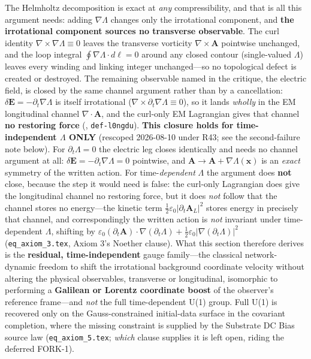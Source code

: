 The Helmholtz decomposition is exact at \emph{any} compressibility, and that is all this argument needs: adding $\nabla\Lambda$ changes only the irrotational component, and \textbf{the irrotational component sources no transverse observable}. The curl identity $\nabla \times \nabla\Lambda \equiv 0$ leaves the transverse vorticity $\nabla \times \mathbf{A}$ pointwise unchanged, and the loop integral $\oint \nabla\Lambda \cdot d\boldsymbol{\ell} = 0$ around any closed contour (single-valued $\Lambda$) leaves every winding and linking integer unchanged---so no topological defect is created or destroyed. The remaining observable named in the critique, the electric field, is closed by the same channel argument rather than by a cancellation: $\delta\mathbf{E} = -\partial_t \nabla\Lambda$ is itself irrotational ($\nabla \times \partial_t\nabla\Lambda \equiv 0$), so it lands \emph{wholly} in the EM longitudinal channel $\nabla\cdot\mathbf{A}$, and the curl-only EM Lagrangian gives that channel \textbf{no restoring force} (, \texttt{def-l0ngdu}). \textbf{This closure holds for time-independent $\Lambda$ ONLY} (rescoped 2026-08-10 under R43; see the second-failure note below). For $\partial_t\Lambda = 0$ the electric leg closes identically and needs no channel argument at all: $\delta\mathbf{E} = -\partial_t\nabla\Lambda = 0$ pointwise, and $\mathbf{A} \to \mathbf{A} + \nabla\Lambda(\mathbf{x})$ is an \emph{exact} symmetry of the written action. For time-\emph{dependent} $\Lambda$ the argument does \textbf{not} close, because the step it would need is false: the curl-only Lagrangian does give the longitudinal channel no restoring force, but it does \emph{not} follow that the channel stores no energy---the kinetic term $\tfrac12\varepsilon_0|\partial_t\mathbf{A}_L|^2$ stores energy in precisely that channel, and correspondingly the written action is \emph{not} invariant under time-dependent $\Lambda$, shifting by $\varepsilon_0(\partial_t\mathbf{A})\cdot\nabla(\partial_t\Lambda) + \tfrac12\varepsilon_0|\nabla(\partial_t\Lambda)|^2$ (\texttt{eq\_axiom\_3.tex}, Axiom 3's Noether clause). What this section therefore derives is the \textbf{residual, time-independent} gauge family---the classical network-dynamic freedom to shift the irrotational background coordinate velocity without altering the physical observables, transverse or longitudinal, isomorphic to performing a \textbf{Galilean or Lorentz coordinate boost} of the observer's reference frame---and \emph{not} the full time-dependent U(1) group. Full U(1) is recovered only on the Gauss-constrained initial-data surface in the covariant completion, where the missing constraint is supplied by the Substrate DC Bias source law (\texttt{eq\_axiom\_5.tex}; \emph{which} clause supplies it is left open, riding the deferred FORK-1).

